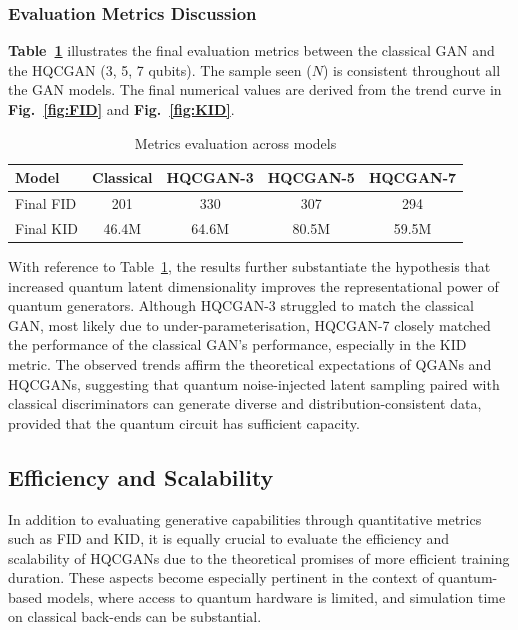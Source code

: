 \documentclass[conference]{IEEEtran}
\begin{document}
\subsubsection{Evaluation Metrics Discussion}

\textbf{Table~\ref{tab:metrics_evaluation}} illustrates the final evaluation metrics between the classical GAN and the HQCGAN (3, 5, 7 qubits). The sample seen ($N$) is consistent throughout all the GAN models. The final numerical values are derived from the trend curve in \textbf{Fig.~\ref{fig:FID}} and \textbf{Fig.~\ref{fig:KID}}.

\begin{table}[htbp]
\caption{Metrics evaluation across models}
\begin{center}
\begin{tabular}{|l|c|c|c|c|}
\hline
\textbf{Model} & \textbf{Classical} & \textbf{HQCGAN-3} & \textbf{HQCGAN-5} & \textbf{HQCGAN-7} \\
\hline
Final FID        & 201   & 330   & 307   & 294   \\
Final KID    & 46.4M  & 64.6M  & 80.5M  & 59.5M  \\
\hline
\end{tabular}
\label{tab:metrics_evaluation}
\end{center}
\end{table}

With reference to Table~\ref{tab:metrics_evaluation}, the results further substantiate the hypothesis that increased quantum latent dimensionality improves the representational power of quantum generators. Although HQCGAN-3 struggled to match the classical GAN, most likely due to under-parameterisation, HQCGAN-7 closely matched the performance of the classical GAN’s performance, especially in the KID metric. The observed trends affirm the theoretical expectations of QGANs and HQCGANs, suggesting that quantum noise-injected latent sampling paired with classical discriminators can generate diverse and distribution-consistent data, provided that the quantum circuit has sufficient capacity.

\subsection{Efficiency and Scalability}

In addition to evaluating generative capabilities through quantitative metrics such as FID and KID, it is equally crucial to evaluate the efficiency and scalability of HQCGANs due to the theoretical promises of more efficient training duration. These aspects become especially pertinent in the context of quantum-based models, where access to quantum hardware is limited, and simulation time on classical back-ends can be substantial.
\end{document}
